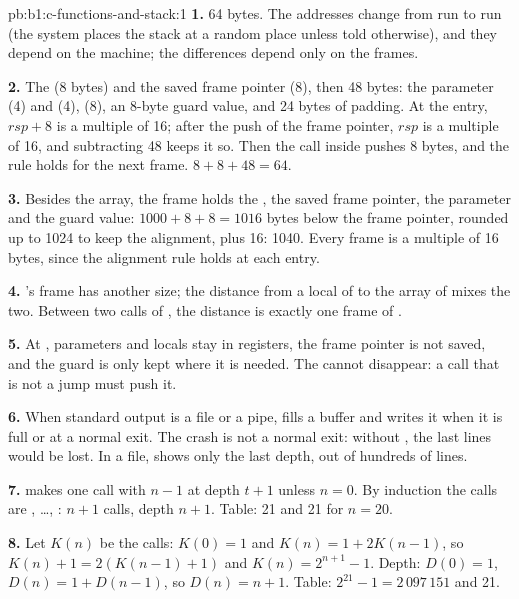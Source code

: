\begin{solution}{pb:b1:c-functions-and-stack:1}
\textbf{1.} 64 bytes. The addresses change from run to run (the system places the stack at a random place unless told
otherwise), and they depend on the machine; the differences depend only on the frames.

\textbf{2.} The  (8 bytes) and the saved frame pointer (8), then 48 bytes: the parameter (4) and
 (4),  (8), an 8-byte guard value, and 24 bytes of padding. At the entry, $rsp + 8$ is a
multiple of 16; after the push of the frame pointer, $rsp$ is a multiple of 16, and subtracting 48 keeps it so.
Then the call inside pushes 8 bytes, and the rule holds for the next frame. $8 + 8 + 48 = 64$.

\textbf{3.} Besides the array, the frame holds the , the saved frame pointer, the parameter
 and the guard value: $1000 + 8 + 8 = 1016$ bytes below the frame pointer, rounded up to 1024 to keep
the alignment, plus 16: 1040. Every frame is a multiple of 16 bytes, since the alignment rule holds at each entry.

\textbf{4.} 's frame has another size; the distance from a local of  to the array of
 mixes the two. Between two calls of , the distance is exactly one frame of .

\textbf{5.} At , parameters and locals stay in registers, the frame pointer is not saved, and the guard is
only kept where it is needed. The  cannot disappear: a call that is not a jump must push it.

\textbf{6.} When standard output is a file or a pipe,  fills a buffer and writes it when it is full or
at a normal exit. The crash is not a normal exit: without , the last lines would be lost. In a file,
 shows only the last depth, out of hundreds of lines.

\textbf{7.}  makes one call with $n - 1$ at depth $t + 1$ unless $n = 0$. By induction the
calls are , \dots, : $n + 1$ calls, depth $n + 1$. Table: 21 and 21 for
$n = 20$.

\textbf{8.} Let $K(n)$ be the calls: $K(0) = 1$ and $K(n) = 1 + 2K(n-1)$, so $K(n) + 1 = 2(K(n-1) + 1)$ and
$K(n) = 2^{n+1} - 1$. Depth: $D(0) = 1$, $D(n) = 1 + D(n-1)$, so $D(n) = n + 1$. Table: $2^{21} - 1 = 2\,097\,151$ and 21.


\end{solution}
